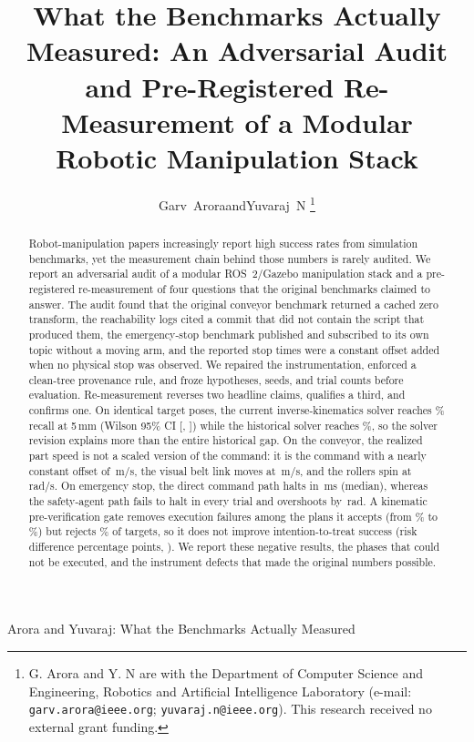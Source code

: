 \documentclass[journal]{IEEEtran}
\begin{document}
\title{What the Benchmarks Actually Measured: An Adversarial Audit and Pre-Registered Re-Measurement of a Modular Robotic Manipulation Stack}

\author{Garv~Arora\quad and\quad Yuvaraj~N%
\thanks{G. Arora and Y. N are with the Department of Computer Science and Engineering, Robotics and Artificial Intelligence Laboratory (e-mail: \texttt{garv.arora@ieee.org}; \texttt{yuvaraj.n@ieee.org}). This research received no external grant funding.}%
}

%
{Arora and Yuvaraj: What the Benchmarks Actually Measured}

\maketitle

\begin{abstract}
Robot-manipulation papers increasingly report high success rates from simulation benchmarks, yet the measurement chain behind those numbers is rarely audited. We report an adversarial audit of a modular ROS~2/Gazebo manipulation stack and a pre-registered re-measurement of four questions that the original benchmarks claimed to answer. The audit found that the original conveyor benchmark returned a cached zero transform, the reachability logs cited a commit that did not contain the script that produced them, the emergency-stop benchmark published and subscribed to its own topic without a moving arm, and the reported stop times were a constant offset added when no physical stop was observed. We repaired the instrumentation, enforced a clean-tree provenance rule, and froze hypotheses, seeds, and trial counts before evaluation. Re-measurement reverses two headline claims, qualifies a third, and confirms one. On \reachN{} identical target poses, the current inverse-kinematics solver reaches \reachRecallCurrentPct\% recall at 5\,mm (Wilson 95\% CI [\reachRecallCurrentLoPct, \reachRecallCurrentHiPct]) while the historical solver reaches \reachRecallOldPct\%, so the solver revision explains more than the entire historical gap. On the conveyor, the realized part speed is not a scaled version of the command: it is the command with a nearly constant offset of \convOffsetMean\,m/s, the visual belt link moves at \convBeltLinkA\,m/s, and the rollers spin at \convRollerA\,rad/s. On emergency stop, the direct command path halts in \estopCommandTstopMs\,ms (median), whereas the safety-agent path fails to halt in every trial and overshoots by \estopSafetyOvershootMed\,rad. A kinematic pre-verification gate removes execution failures among the plans it accepts (from \nFourBaselineExecFailPct\% to \nFourExecFailPct\%) but rejects \nFourCoveragePct\% of targets, so it does not improve intention-to-treat success (risk difference \nFourRiskDiffPct{} percentage points, \nFourP). We report these negative results, the phases that could not be executed, and the instrument defects that made the original numbers possible.
\end{abstract}
\end{document}
